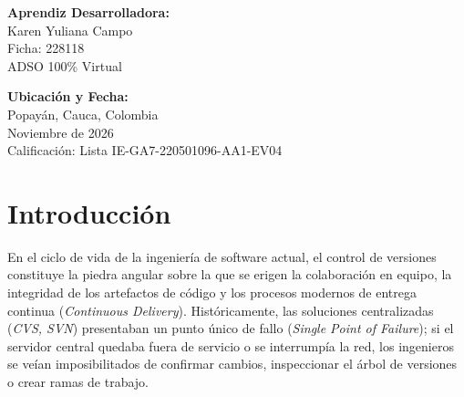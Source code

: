 \documentclass[11pt,a4paper]{article}
\begin{document}
\begin{titlepage}
    \begin{minipage}{0.48\textwidth}
        \flushleft
        \textbf{\color{senaDark} Aprendiz Desarrolladora:}\\
        Karen Yuliana Campo\\
        Ficha: 228118\\
        ADSO 100\% Virtual
    \end{minipage}
    \hfill
    \begin{minipage}{0.48\textwidth}
        \flushright
        \textbf{\color{senaDark} Ubicación y Fecha:}\\
        Popayán, Cauca, Colombia\\
        Noviembre de 2026\\
        Calificación: Lista IE-GA7-220501096-AA1-EV04
    \end{minipage}
    
    \vfill
\end{titlepage}

\tableofcontents
\newpage

\section{Introducción}

En el ciclo de vida de la ingeniería de software actual, el control de versiones constituye la piedra angular sobre la que se erigen la colaboración en equipo, la integridad de los artefactos de código y los procesos modernos de entrega continua (\textit{Continuous Delivery}). Históricamente, las soluciones centralizadas (\textit{CVS, SVN}) presentaban un punto único de fallo (\textit{Single Point of Failure}); si el servidor central quedaba fuera de servicio o se interrumpía la red, los ingenieros se veían imposibilitados de confirmar cambios, inspeccionar el árbol de versiones o crear ramas de trabajo.
\end{document}
